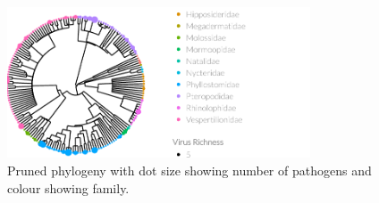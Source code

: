 \begin{knitrout}\footnotesize
{}\color{fgcolor}\begin{figure}[t]

{\centering \includegraphics[width=0.8\textwidth]{figure/treePlot-1} 

}

\caption[Pruned phylogeny with dot size showing number of pathogens and colour showing family]{Pruned phylogeny with dot size showing number of pathogens and colour showing family.}\label{fig:treePlot}
\end{figure}


\end{knitrout}



